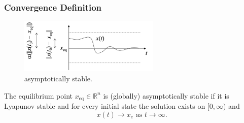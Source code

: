 \documentclass{article}
\begin{document}
\subsubsection{Convergence Definition}
\begin{figure}[H]
    \centering
    \includegraphics[width=0.6\textwidth]{Figs/7.png}
    \caption{asymptotically stable.}
\end{figure}
\begin{defa}
The equilibrium point $x_{\mathrm{eq}} \in \mathbb{R}^{n}$ is (globally) asymptotically stable if it is Lyapunov stable and for every initial state the solution exists on $[0, \infty)$ and $$x(t) \rightarrow x_{e}\text{ as }t \rightarrow \infty.$$
\end{defa}
\end{document}
